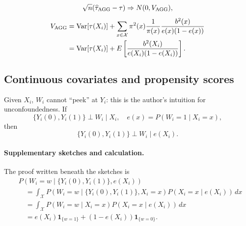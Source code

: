 \documentclass[11pt,a4paper]{article}
\begin{document}
\[
\sqrt n(\widehat\tau_{\rm AGG}-\tau)\Rightarrow N(0,V_{\rm AGG}),
\]
\begin{align*}
V_{\rm AGG}&=\operatorname{Var}[\tau(X_i)]
+\sum_{x\in\mathcal X}\pi^2(x)\frac1{\pi(x)}
\frac{b^2(x)}{e(x)(1-e(x))}\\
&=\operatorname{Var}[\tau(X_i)]
+E\left[\frac{b^2(X_i)}{e(X_i)(1-e(X_i))}\right].
\end{align*}
\subsection{Continuous covariates and propensity scores}
Given $X_i$, $W_i$ cannot ``peek'' at $Y_i$: this is the author's intuition for unconfoundedness. If
\[
\{Y_i(0),Y_i(1)\}\perp W_i\mid X_i,
\quad e(x)=P(W_i=1\mid X_i=x),
\]
then
\[
\{Y_i(0),Y_i(1)\}\perp W_i\mid e(X_i).
\]
\paragraph{Supplementary sketches and calculation.}
\begin{center}
\end{center}
The proof written beneath the sketches is
\begin{align*}
&P(W_i=w\mid\{Y_i(0),Y_i(1)\},e(X_i))\\
&\quad=\int_{\mathcal X}P(W_i=w\mid\{Y_i(0),Y_i(1)\},X_i=x)
 P(X_i=x\mid e(X_i))\,dx\\
&\quad=\int_{\mathcal X}P(W_i=w\mid X_i=x)P(X_i=x\mid e(X_i))\,dx\\
&\quad=e(X_i)\mathbf1_{\{w=1\}}+(1-e(X_i))\mathbf1_{\{w=0\}}.
\end{align*}
\end{document}

